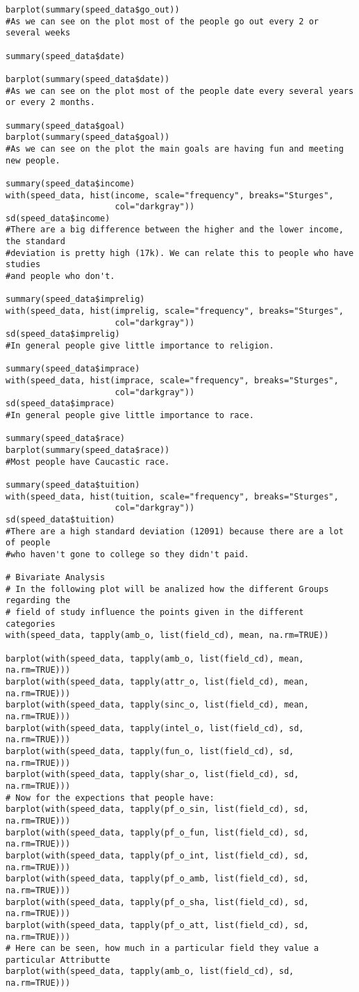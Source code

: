 \begin{verbatim}
barplot(summary(speed_data$go_out))
#As we can see on the plot most of the people go out every 2 or several weeks

summary(speed_data$date)

barplot(summary(speed_data$date))
#As we can see on the plot most of the people date every several years or every 2 months.

summary(speed_data$goal)
barplot(summary(speed_data$goal))
#As we can see on the plot the main goals are having fun and meeting new people.

summary(speed_data$income)
with(speed_data, hist(income, scale="frequency", breaks="Sturges", 
                      col="darkgray"))
sd(speed_data$income)
#There are a big difference between the higher and the lower income, the standard 
#deviation is pretty high (17k). We can relate this to people who have studies 
#and people who don't.

summary(speed_data$imprelig)
with(speed_data, hist(imprelig, scale="frequency", breaks="Sturges", 
                      col="darkgray"))
sd(speed_data$imprelig)
#In general people give little importance to religion.

summary(speed_data$imprace)
with(speed_data, hist(imprace, scale="frequency", breaks="Sturges", 
                      col="darkgray"))
sd(speed_data$imprace)
#In general people give little importance to race.

summary(speed_data$race)
barplot(summary(speed_data$race))
#Most people have Caucastic race.

summary(speed_data$tuition)
with(speed_data, hist(tuition, scale="frequency", breaks="Sturges", 
                      col="darkgray"))
sd(speed_data$tuition)
#There are a high standard deviation (12091) because there are a lot of people
#who haven't gone to college so they didn't paid.

# Bivariate Analysis
# In the following plot will be analized how the different Groups regarding the
# field of study influence the points given in the different categories
with(speed_data, tapply(amb_o, list(field_cd), mean, na.rm=TRUE))

barplot(with(speed_data, tapply(amb_o, list(field_cd), mean, na.rm=TRUE)))
barplot(with(speed_data, tapply(attr_o, list(field_cd), mean, na.rm=TRUE)))
barplot(with(speed_data, tapply(sinc_o, list(field_cd), mean, na.rm=TRUE)))
barplot(with(speed_data, tapply(intel_o, list(field_cd), sd, na.rm=TRUE)))
barplot(with(speed_data, tapply(fun_o, list(field_cd), sd, na.rm=TRUE)))
barplot(with(speed_data, tapply(shar_o, list(field_cd), sd, na.rm=TRUE)))
# Now for the expections that people have:
barplot(with(speed_data, tapply(pf_o_sin, list(field_cd), sd, na.rm=TRUE)))
barplot(with(speed_data, tapply(pf_o_fun, list(field_cd), sd, na.rm=TRUE)))
barplot(with(speed_data, tapply(pf_o_int, list(field_cd), sd, na.rm=TRUE)))
barplot(with(speed_data, tapply(pf_o_amb, list(field_cd), sd, na.rm=TRUE)))
barplot(with(speed_data, tapply(pf_o_sha, list(field_cd), sd, na.rm=TRUE)))
barplot(with(speed_data, tapply(pf_o_att, list(field_cd), sd, na.rm=TRUE)))
# Here can be seen, how much in a particular field they value a particular Attributte
barplot(with(speed_data, tapply(amb_o, list(field_cd), sd, na.rm=TRUE)))


\end{verbatim}
